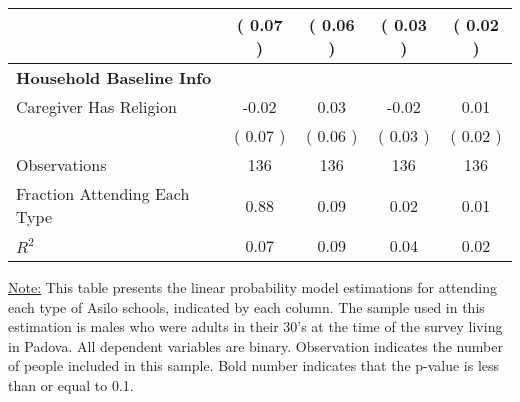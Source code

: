 \begin{table}[H]
{\begin{tabular}{lcccc}
\quad  & (     0.07 ) & \textbf{(     0.06 )}  & (     0.03 )  & (     0.02 )  \\
\midrule
\textbf{Household Baseline Info} \\
\quad Caregiver Has Religion &     -0.02 &      0.03 &     -0.02 &      0.01 \\
\quad  & (     0.07 ) & (     0.06 )  & (     0.03 )  & (     0.02 )  \\
\midrule
Observations & 136 & 136 & 136 & 136 \\
Fraction Attending Each Type &      0.88 &      0.09 &      0.02 &      0.01 \\
\midrule
$ R^2$ &      0.07 &      0.09 &      0.04 &      0.02 \\
\bottomrule
\end{tabular}}
\end{table}
\begin{footnotesize}
\noindent\underline{Note:} This table presents the linear probability model estimations for attending each type of Asilo schools, indicated by each column. The sample used in this estimation is males who were adults in their 30's at the time of the survey living in Padova. All dependent variables are binary. Observation indicates the number of people included in this sample. Bold number indicates that the p-value is less than or equal to 0.1.
\end{footnotesize}
